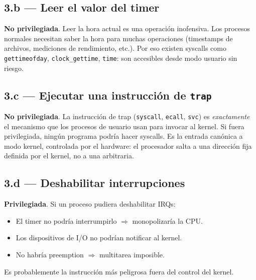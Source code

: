 \documentclass[11pt,a4paper]{article}
\begin{document}
\subsection*{3.b --- Leer el valor del timer}

\begin{respuesta}
\textbf{No privilegiada}. Leer la hora actual es una operación
inofensiva. Los procesos normales necesitan saber la hora para
muchas operaciones (timestamps de archivos, mediciones de
rendimiento, etc.). Por eso existen syscalls como
\texttt{gettimeofday}, \texttt{clock\_gettime}, \texttt{time}: son
accesibles desde modo usuario sin riesgo.
\end{respuesta}

\subsection*{3.c --- Ejecutar una instrucción de \texttt{trap}}

\begin{respuesta}
\textbf{No privilegiada}. La instrucción de trap (\texttt{syscall},
\texttt{ecall}, \texttt{svc}) es \emph{exactamente} el mecanismo que
los procesos de usuario usan para invocar al kernel. Si fuera
privilegiada, ningún programa podría hacer syscalls. Es la entrada
canónica a modo kernel, controlada por el hardware: el procesador
salta a una dirección fija definida por el kernel, no a una
arbitraria.
\end{respuesta}

\subsection*{3.d --- Deshabilitar interrupciones}

\begin{respuesta}
\textbf{Privilegiada}. Si un proceso pudiera deshabilitar IRQs:

\begin{itemize}[leftmargin=*,nosep]
    \item El timer no podría interrumpirlo $\Rightarrow$
        monopolizaría la CPU.
    \item Los dispositivos de I/O no podrían notificar al kernel.
    \item No habría preemption $\Rightarrow$ multitarea imposible.
\end{itemize}

Es probablemente la instrucción más peligrosa fuera del control del
kernel.
\end{respuesta}
\end{document}
